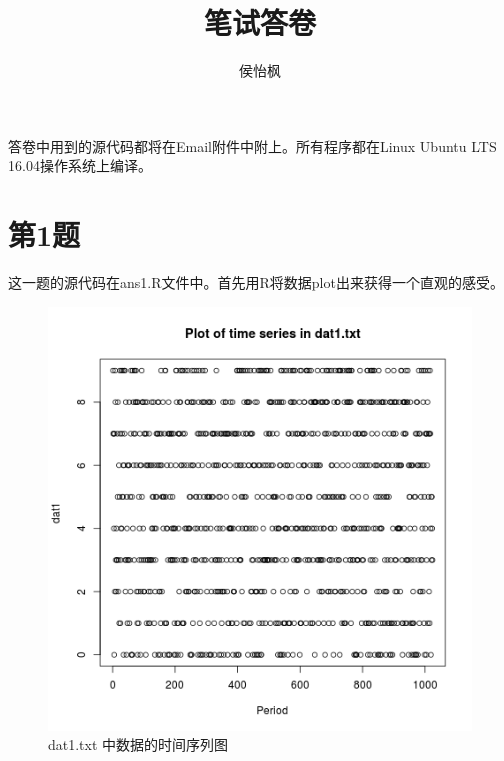\documentclass[11pt]{article}
\title{笔试答卷}
\author{侯怡枫}
\begin{document}
\maketitle

答卷中用到的源代码都将在Email附件中附上。所有程序都在Linux Ubuntu LTS 16.04操作系统上编译。

\section*{第1题}

这一题的源代码在ans1.R文件中。首先用R将数据plot出来获得一个直观的感受。
\begin{figure}[h]
	\centering
	\includegraphics[scale=0.4]{dat1_plot.png}
	\caption{dat1.txt 中数据的时间序列图}
\label{dat1_plot}
\end{figure}
\end{document}
